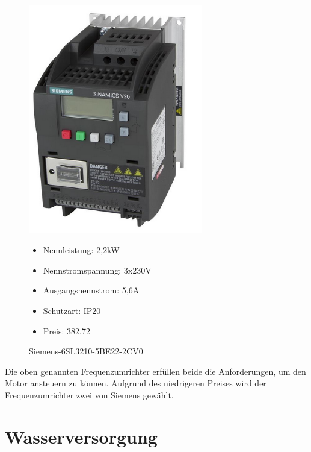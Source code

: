 \documentclass[12pt]{scrreprt} %
\begin{document}
\begin{figure}
\begin{minipage}[t]{0.45\textwidth}
\includegraphics[width=0.68\textwidth]{SiemensV20}
\caption{Siemens-6SL3210-5BE22-2CV0}

\begin{itemize}
	\item{Nennleistung: 2,2kW}
	\item{Nennstromspannung: 3x230V}
	\item{Ausgangsnennstrom: 5,6A}
	\item{Schutzart: IP20}
	\item{Preis: 382,72\textsf{\texteuro}}
\end{itemize}

\end{minipage}
\end{figure}

Die oben genannten Frequenzumrichter erfüllen beide die Anforderungen, um den Motor ansteuern zu können. Aufgrund des niedrigeren Preises wird der Frequenzumrichter zwei von Siemens gewählt. 


\newpage
\section{Wasserversorgung}
\label{sec:wasserversorgung}
\end{document}
